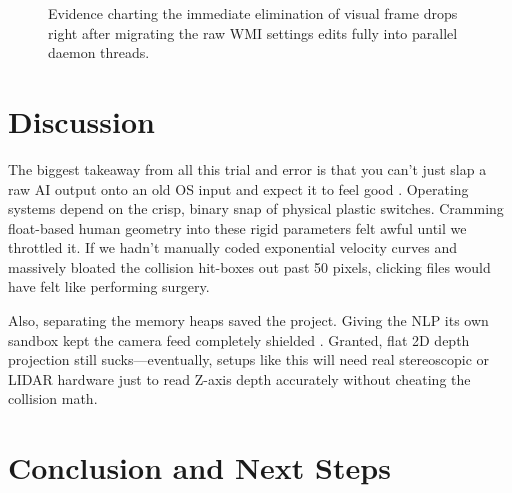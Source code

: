 \documentclass[conference]{IEEEtran}
\begin{document}

\begin{figure}[htbp]
\centering
{}
\caption{Evidence charting the immediate elimination of visual frame drops right after migrating the raw WMI settings edits fully into parallel daemon threads.}
\label{fig_latency}
\end{figure}


\section{Discussion}

The biggest takeaway from all this trial and error is that you can't just slap a raw AI output onto an old OS input and expect it to feel good \cite{b20}. Operating systems depend on the crisp, binary snap of physical plastic switches. Cramming float-based human geometry into these rigid parameters felt awful until we throttled it. If we hadn't manually coded exponential velocity curves and massively bloated the collision hit-boxes out past 50 pixels, clicking files would have felt like performing surgery.

Also, separating the memory heaps saved the project. Giving the NLP its own sandbox kept the camera feed completely shielded \cite{b5}. Granted, flat 2D depth projection still sucks—eventually, setups like this will need real stereoscopic or LIDAR hardware just to read Z-axis depth accurately without cheating the collision math.


\section{Conclusion and Next Steps}
\end{document}
